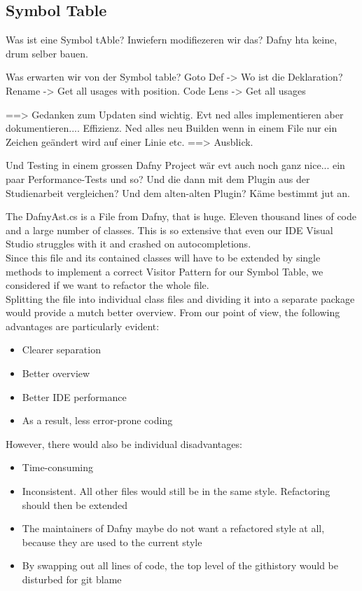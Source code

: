 \subsection{Symbol Table}
Was ist eine Symbol tAble?
Inwiefern modifiezeren wir das?
Dafny hta keine, drum selber bauen.

Was erwarten wir von der Symbol table?
Goto Def -> Wo ist die Deklaration?
Rename -> Get all usages with position.
Code Lens -> Get all usages


==> Gedanken zum Updaten sind wichtig. Evt ned alles implementieren aber dokumentieren.... Effizienz. Ned alles neu Builden
wenn in einem File nur ein Zeichen geändert wird auf einer Linie etc. ==> Ausblick.

Und Testing in einem grossen Dafny Project wär evt auch noch ganz nice... ein paar Performance-Tests und so?
Und die dann mit dem Plugin aus der Studienarbeit vergleichen? Und dem alten-alten Plugin? Käme bestimmt jut an. 

The DafnyAst.cs is a File from Dafny, that is huge.
Eleven thousand lines of code and a large number of classes.
This is so extensive that even our IDE Visual Studio struggles with it and crashed on autocompletions. \\

Since this file and its contained classes will have to be extended by single methods
to implement a correct Visitor Pattern for our Symbol Table, we considered if we want to refactor the whole file.  \\

Splitting the file into individual class files and dividing it into a separate package would provide a mutch better overview.
From our point of view, the following advantages are particularly evident:
\begin{itemize}
    \item Clearer separation
    \item Better overview
    \item Better IDE performance
    \item As a result, less error-prone coding
\end{itemize}

However, there would also be individual disadvantages:
\begin{itemize}
    \item Time-consuming
    \item Inconsistent. All other files would still be in the same style. Refactoring should then be extended
    \item The maintainers of Dafny maybe do not want a refactored style at all, because they are used to the current style
    \item By swapping out all lines of code, the top level of the githistory would be disturbed for git blame
\end{itemize}

